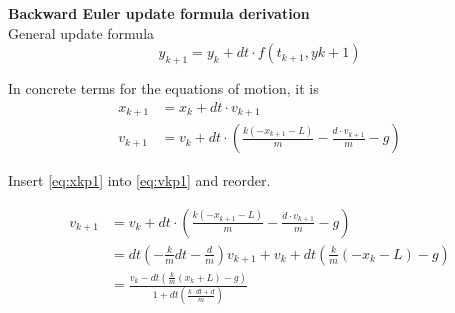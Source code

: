 \documentclass[a4paper,10pt]{minimal}
\begin{document}
{\bfseries Backward Euler update formula derivation}\\
General update formula
\begin{equation}
 y_{k+1} = y_k + dt \cdot f(t_{k+1}, y{k+1})
\end{equation}

In concrete terms for the equations of motion, it is
\begin{subequations}
 \begin{align}
  x_{k+1} &= x_k + dt \cdot v_{k+1}
  \label{eq:xkp1}\\
  v_{k+1} &= v_k + dt \cdot \left( \frac{k(-x_{k+1} -L)}{m} - \frac{d\cdot v_{k+1}}{m} -g \right)
  \label{eq:vkp1}
 \end{align}
\end{subequations}

Insert \eqref{eq:xkp1} into \eqref{eq:vkp1} and reorder.

\begin{subequations}
 \begin{align}
  v_{k+1} &= v_k + dt \cdot \left( \frac{k(-x_{k+1} -L)}{m} - \frac{d\cdot v_{k+1}}{m} -g \right)\\
          &= dt\left(-\frac{k}{m}dt - \frac{d}{m}\right) v_{k+1} + v_k + dt\left( \frac{k}{m}(-x_k-L)-g \right)\\
          &= \frac{ v_k -dt \left(\frac{k}{m} (x_k + L) -g \right)}{1+dt \left( \frac{k\cdot dt + d}{m} \right)}
 \end{align}
\end{subequations}
\end{document}
